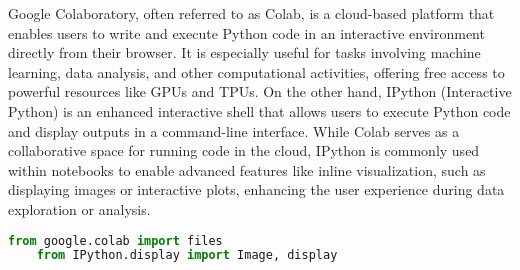 Google Colaboratory, often referred to as Colab, is a cloud-based platform that enables users to write and execute Python code in an interactive environment directly from their browser. It is especially useful for tasks involving machine learning, data analysis, and other computational activities, offering free access to powerful resources like GPUs and TPUs. On the other hand, IPython (Interactive Python) is an enhanced interactive shell that allows users to execute Python code and display outputs in a command-line interface. While Colab serves as a collaborative space for running code in the cloud, IPython is commonly used within notebooks to enable advanced features like inline visualization, such as displaying images or interactive plots, enhancing the user experience during data exploration or analysis.

\begin{lstlisting}[language=Python, caption={Importing modules from Google Colab and IPython for file handling and displaying images}, label={code:import-colab-ipython}, style=pythonstyle]
	from google.colab import files
	from IPython.display import Image, display
\end{lstlisting}

